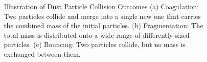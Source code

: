 \begin{figure}[h!]
    \centering
    \makebox[\textwidth]{
        \begin{minipage}{.33\paperwidth}
            \centering
          	\subfloat[Coagulation]{  %
                \label{:a}
                \illustrateCoagulation
          	}
        \end{minipage}%
        \begin{minipage}{.33\paperwidth}
            \centering
          	\subfloat[Fragmentation]{
                \label{:b}
                \illustrateFragmentation
          	}
        \end{minipage}
        \begin{minipage}{.33\paperwidth}
            \centering
          	\subfloat[Bouncing]{
                \label{:b}
                \illustrateBouncing
          	}
        \end{minipage}%
    }
    \caption{
        Illustration of Dust Particle Collision Outcomes
        (a) Coagulation: Two particles collide and merge into a single new one that
            carries the combined mass of the initial particles.
        (b) Fragmentation: The total mass is distributed onto a wide range of differently-sized 
            particles.
        (c) Bouncing: Two particles collide, but no mass is exchanged between them.
    }
\end{figure} 

